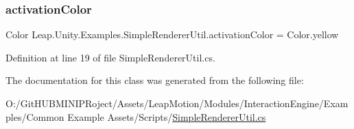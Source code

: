 \subsubsection{\texorpdfstring{activationColor}{activationColor}}
{\footnotesize\ttfamily Color Leap.\+Unity.\+Examples.\+Simple\+Renderer\+Util.\+activation\+Color = Color.\+yellow}



Definition at line 19 of file Simple\+Renderer\+Util.\+cs.



The documentation for this class was generated from the following file\+:\begin{DoxyCompactItemize}
\item 
O\+:/\+Git\+H\+U\+B\+M\+I\+N\+I\+P\+Roject/\+Assets/\+Leap\+Motion/\+Modules/\+Interaction\+Engine/\+Examples/\+Common Example Assets/\+Scripts/\mbox{\hyperlink{_simple_renderer_util_8cs}{Simple\+Renderer\+Util.\+cs}}\end{DoxyCompactItemize}
